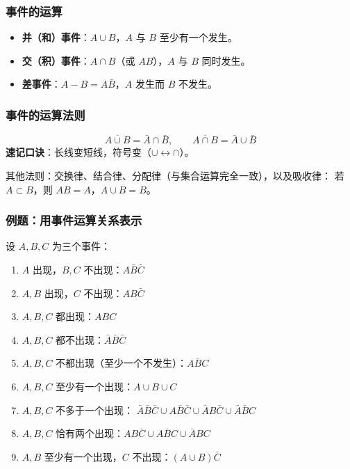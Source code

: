 \documentclass[12pt, a4paper]{article}
\begin{document}
\subsubsection{事件的运算}

\begin{itemize}
    \item \textbf{并（和）事件}：$A \cup B$，$A$ 与 $B$ 至少有一个发生。
    \item \textbf{交（积）事件}：$A \cap B$（或 $AB$），$A$ 与 $B$ 同时发生。
    \item \textbf{差事件}：$A - B = A\bar{B}$，$A$ 发生而 $B$ 不发生。
\end{itemize}

\subsubsection{事件的运算法则}

\begin{tcolorbox}[thmbox, title={德摩根律（对偶律）—— 最重要，必考}]
    \[
        \overline{A \cup B} = \bar{A} \cap \bar{B}, \qquad
        \overline{A \cap B} = \bar{A} \cup \bar{B}
    \]
    \textbf{速记口诀}：长线变短线，符号变（$\cup \leftrightarrow \cap$）。
\end{tcolorbox}

其他法则：交换律、结合律、分配律（与集合运算完全一致），以及吸收律：
若 $A \subset B$，则 $AB = A$，$A \cup B = B$。

\subsubsection{例题：用事件运算关系表示}

设 $A, B, C$ 为三个事件：

\begin{enumerate}
    \item $A$ 出现，$B, C$ 不出现：$A\bar{B}\bar{C}$
    \item $A, B$ 出现，$C$ 不出现：$AB\bar{C}$
    \item $A, B, C$ 都出现：$ABC$
    \item $A, B, C$ 都不出现：$\bar{A}\bar{B}\bar{C}$
    \item $A, B, C$ 不都出现（至少一个不发生）：$\overline{ABC}$
    \item $A, B, C$ 至少有一个出现：$A \cup B \cup C$
    \item $A, B, C$ 不多于一个出现：
          $\bar{A}\bar{B}\bar{C} \cup A\bar{B}\bar{C} \cup \bar{A}B\bar{C} \cup \bar{A}\bar{B}C$
    \item $A, B, C$ 恰有两个出现：$AB\bar{C} \cup A\bar{B}C \cup \bar{A}BC$
    \item $A, B$ 至少有一个出现，$C$ 不出现：$(A \cup B)\bar{C}$
\end{enumerate}
\end{document}
